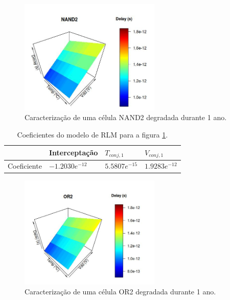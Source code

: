 \begin{figure}[H]
	\center
	\includegraphics[width=0.6\textwidth]{images/delays_nand2_caracterizacao_200Pontos_gauss80_10}
	\caption{Caracterização de uma célula NAND2 degradada durante 1 ano.}
	\label{figure:delays_nand2_caracterizacao_200Pontos_gauss80_10}	
\end{figure}
\begin{table}[H]
	\centering
	\caption{Coeficientes do modelo de RLM para a figura \ref{figure:delays_nand2_caracterizacao_200Pontos_gauss80_10}.}
	\begin{tabular}{@{}l|l|l|l@{}}
		\toprule
		& Interceptação & $T_{conj,1}$ & $V_{conj,1}$ \\ \midrule
		Coeficiente & $-1.2030e^{-12}$ & $5.5807e^{-15}$ & $1.9283e^{-12}$ \\ \bottomrule
	\end{tabular}
	\label{tb:regressao_multipla_NAND2}
\end{table}
\begin{figure}[H]
	\center
	\includegraphics[width=0.6\textwidth]{images/delays_or2_caracterizacao_200Pontos_gauss80_10}
	\caption{Caracterização de uma célula OR2 degradada durante 1 ano.}
	\label{figure:delays_or2_caracterizacao_200Pontos_gauss80_10}	
\end{figure}
